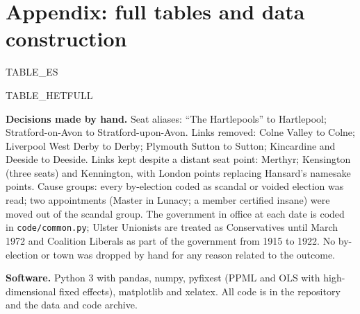\documentclass[11pt,a4paper]{article}
\begin{document}
\appendix
\section{Appendix: full tables and data construction}
{{TABLE_ES}}

{{TABLE_HETFULL}}

\textbf{Decisions made by hand.} Seat aliases: ``The Hartlepools'' to Hartlepool; Stratford-on-Avon to Stratford-upon-Avon. Links removed: Colne Valley to Colne; Liverpool West Derby to Derby; Plymouth Sutton to Sutton; Kincardine and Deeside to Deeside. Links kept despite a distant seat point: Merthyr; Kensington (three seats) and Kennington, with London points replacing Hansard's namesake points. Cause groups: every by-election coded as scandal or voided election was read; two appointments (Master in Lunacy; a member certified insane) were moved out of the scandal group. The government in office at each date is coded in \texttt{code/common.py}; Ulster Unionists are treated as Conservatives until March 1972 and Coalition Liberals as part of the government from 1915 to 1922. No by-election or town was dropped by hand for any reason related to the outcome.

\textbf{Software.} Python 3 with pandas, numpy, pyfixest (PPML and OLS with high-dimensional fixed effects), matplotlib and xelatex. All code is in the repository and the data and code archive.
\end{document}
